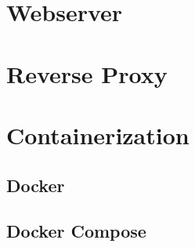 \section{Webserver}

\section{Reverse Proxy}

\section{Containerization}
\subsection{Docker}
\subsection{Docker Compose}